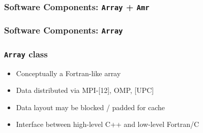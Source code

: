 \documentclass{beamer}
\newcommand{\code}[1]{\texttt{#1}}
\begin{document}
    \begin{frame}[fragile] \frametitle{Software Components: \code{Array} + \code{Amr}}
\end{frame}

    \begin{frame}[fragile] \frametitle{Software Components: \code{Array}}
\end{frame}

\begin{frame}
\frametitle{\code{Array} class}

\begin{itemize}
\item Conceptually a Fortran-like array
\item Data distributed via MPI-[12], OMP, [UPC]
\item Data layout may be blocked / padded for cache
\item Interface between high-level C++ and low-level Fortran/C
\end{itemize}
\end{frame}
\end{document}
